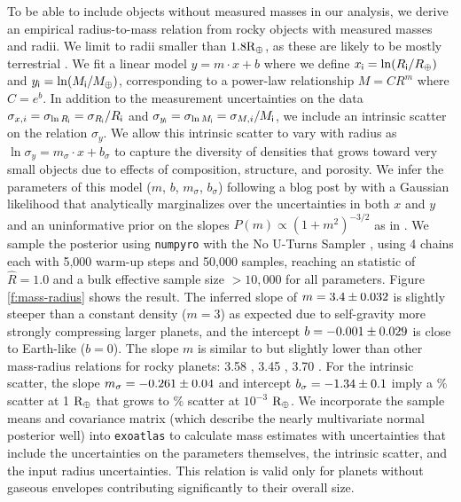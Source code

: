 \documentclass[modern,linenumbers,trackchanges]{aastex7}
\begin{document}
To be able to include objects without measured masses in our analysis, we derive an empirical radius-to-mass relation from rocky objects with measured masses and radii. We limit to radii smaller than $1.8 {\rm R_\oplus}$, as these are likely to be mostly terrestrial \citep{fultonCaliforniaKeplerSurveyVII2018, zengNewPerspectivesExoplanet2021, rogersMostSuperEarthsHave2025}. We fit a linear model $y = m\cdot x + b$ where we define $x_{\sf i} = \ln (R_{\sf i}/R_\oplus)$ and $y_{\sf i} = \ln (M_{\sf i}/M_\oplus)$, corresponding to a power-law relationship $M = CR^m$ where $C = e^b$. In addition to the measurement uncertainties on the data $\sigma_{x,i} = \sigma_{\ln R_{\sf i}} = \sigma_{R_{\sf i}}/{R_{\sf i}}$ and $ \sigma_{y_{\sf i}} =  \sigma_{\ln M_{\sf i}} =  \sigma_{M,i}/M_{\sf i}$, we include an intrinsic scatter on the relation $\sigma_{y}$. We allow this intrinsic scatter to vary with radius as $\ln \sigma_{y} = m_\sigma \cdot x + b_\sigma$ to capture the diversity of densities that grows toward very small objects due to effects of composition, structure, and porosity. We infer the parameters of this model ($m$, $b$, $m_\sigma$, $b_\sigma$) following a blog post by \citet[][see also \citealt{hoggDataAnalysisRecipes2010a}]{foreman-mackeyFittingPlaneData2017} with a Gaussian likelihood that analytically marginalizes over the uncertainties in both $x$ and $y$ and an uninformative prior on the slopes $P(m) \propto (1+m^2)^{-3/2}$ as in \citet{vanderplasFrequentismBayesianismPythondriven2014a}. We sample the posterior using \texttt{numpyro} \citep{phanComposableEffectsFlexible2019} with the No U-Turns Sampler \citep[NUTS;][]{hoffmanNoUTurnSamplerAdaptively2011}, using 4 chains each with 5,000 warm-up steps and 50,000 samples, reaching an \citet{gelmanInferenceIterativeSimulation1992} statistic of $\hat{R}=1.0$ and a bulk effective sample size $>10,000$ \citep[][see also \citealt{hoggDataAnalysisRecipes2018}]{vehtariRankNormalizationFoldingLocalization2021} for all parameters. Figure \ref{f:mass-radius} shows the result. The inferred slope of $m = 3.4 \pm 0.032 $ is slightly steeper than a constant density ($m=3$) as expected due to self-gravity more strongly compressing larger planets, and the intercept $b = -0.001 \pm 0.029$ is close to Earth-like ($b=0$). The slope $m$ is similar to but slightly lower than other mass-radius relations for rocky planets:  3.58 \citep[$1/0.279 =$;][]{chenPROBABILISTICFORECASTINGMASSES2017}, 3.45 \citep{otegiRevisitedMassradiusRelations2020}, 3.70 \citep[$=1/0.27$;][]{mullerMassradiusRelationExoplanets2024}. For the intrinsic scatter, the slope $m_\sigma = -0.261 \pm 0.04 $ and intercept $b_\sigma = -1.34 \pm 0.1$ imply a \mrscatteratearthjustvalue\% scatter at 1 ${\rm R_\oplus}$ that grows to \mrscatteratsmalljustvalue\% scatter at $10^{-3}$ ${\rm R_\oplus}$. We incorporate the sample means and covariance matrix (which describe the nearly multivariate normal posterior well) into \texttt{exoatlas} to calculate mass estimates with uncertainties that include the uncertainties on the parameters themselves, the intrinsic scatter, and the input radius uncertainties. This relation is valid only for planets without gaseous envelopes contributing significantly to their overall size.
\end{document}
